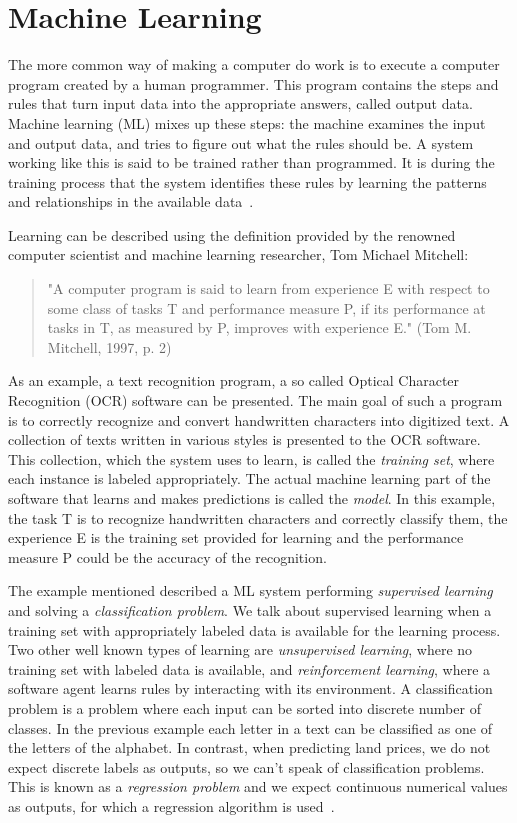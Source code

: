 \documentclass[a4paper,oneside,onecolumn,12pt]{book}
\begin{document}
\section{Machine Learning}
The more common way of making a computer do work is to execute a computer program created by a human programmer. This program contains the steps and rules that turn input data into the appropriate answers, called output data. Machine learning (ML) mixes up these steps: the machine examines the input and output data, and tries to figure out what the rules should be. A system working like this is said to be trained rather than programmed. It is during the training process that the system identifies these rules by learning the patterns and relationships in the available data~\cite{DLP}.

Learning can be described using the definition provided by the renowned computer scientist and machine learning researcher, Tom Michael Mitchell:
\begin{quote}
	"A computer program is said to learn from experience E with respect to some class of tasks T and performance measure P, if its performance at tasks in T, as measured by P, improves with experience E." (Tom M. Mitchell, 1997, p. 2)\cite{ML}
\end{quote}
As an example, a text recognition program, a so called Optical Character Recognition (OCR) software can be presented. The main goal of such a program is to correctly recognize and convert handwritten characters into digitized text. A collection of texts written in various styles is presented to the OCR software. This collection, which the system uses to learn, is called the \textit{training set}, where each instance is labeled appropriately. The actual machine learning part of the software that learns and makes predictions is called the \textit{model}. In this example, the task T is to recognize handwritten characters and correctly classify them, the experience E is the training set provided for learning and the performance measure P could be the accuracy of the recognition.

The example mentioned described a ML system performing \textit{supervised learning} and solving a \textit{classification problem}. We talk about supervised learning when a training set with appropriately labeled data is available for the learning process. Two other well known types of learning are \textit{unsupervised learning}, where no training set with labeled data is available, and \textit{reinforcement learning}, where a software agent learns rules by interacting with its environment. A classification problem is a problem where each input can be sorted into discrete number of classes. In the previous example each letter in a text can be classified as one of the letters of the alphabet. In contrast, when predicting land prices, we do not expect discrete labels as outputs, so we can't speak of classification problems. This is known as a \textit{regression problem} and we expect continuous numerical values as outputs, for which a regression algorithm is used~\cite{AISL}.
\end{document}
